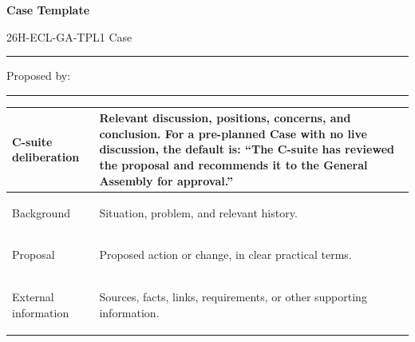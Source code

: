 \documentclass{../../../Common/Latex/Templates/rapport}
\date{\meetingdate, \meetingtime}
\begin{document}
\reportmainmatter
\small
\setlength{\parindent}{0pt}
\setlength{\tabcolsep}{6pt}
\renewcommand{\arraystretch}{1.2}

\begin{center}
  {\Large\bfseries Case Template}\par
  \vspace{0.15cm}
  {\normalsize 26H-ECL-GA-TPL1 \textperiodcentered{} Case \rule{1cm}{0.4pt} \textperiodcentered{} Proposed by: \rule{4cm}{0.4pt}}\par
  \vspace{0.1cm}
  {\small \meetingline}\par
\end{center}

\vspace{0.3cm}
\begin{tabularx}{\textwidth}{|>{\bfseries\raggedright\arraybackslash}p{4.2cm}|X|}
  \hline
  C-suite deliberation & \rule{0pt}{4.1cm}Relevant discussion, positions, concerns, and conclusion. For a pre-planned Case with no live discussion, the default is: ``The C-suite has reviewed the proposal and recommends it to the General Assembly for approval.'' \\
  \hline
  Background           & \rule{0pt}{4.1cm}Situation, problem, and relevant history.                                                                                                                                                                                   \\
  \hline
  Proposal             & \rule{0pt}{4.1cm}Proposed action or change, in clear practical terms.                                                                                                                                                                        \\
  \hline
  External information & \rule{0pt}{4.1cm}Sources, facts, links, requirements, or other supporting information.                                                                                                                                                       \\
  \hline
\end{tabularx}
\end{document}
